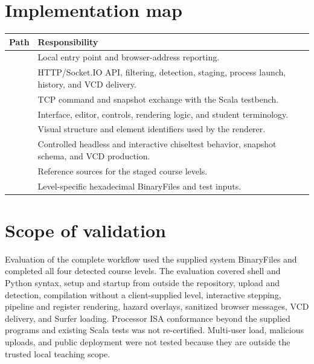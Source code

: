 \documentclass[11pt,a4paper]{article}
\begin{document}



\clearpage
\appendix
\section{Implementation map}\label{app:implementation-map}

\begin{center}
\centering
{}
\label{tab:implementation-map}
\footnotesize
\begin{tabularx}{\textwidth}{@{}>{\raggedright\arraybackslash}p{}Y@{}}
\toprule
Path & Responsibility \\
\midrule
{} & Local entry point and browser-address reporting. \\
 & HTTP/Socket.IO API, filtering, detection, staging, process launch, history, and VCD delivery. \\
 & TCP command and snapshot exchange with the Scala testbench. \\
 & Interface, editor, controls, rendering logic, and student terminology. \\
 & Visual structure and element identifiers used by the renderer. \\
 & Controlled headless and interactive chiseltest behavior, snapshot schema, and VCD production. \\
 & Reference sources for the staged course levels. \\
 & Level-specific hexadecimal BinaryFiles and test inputs. \\
\bottomrule
\end{tabularx}
\end{center}

\section{Scope of validation}

Evaluation of the complete workflow used the supplied system BinaryFiles and completed all four detected course levels. The evaluation covered shell and Python syntax, setup and startup from outside the repository, upload and detection, compilation without a client-supplied level, interactive stepping, pipeline and register rendering, hazard overlays, sanitized browser messages, VCD delivery, and Surfer loading. Processor ISA conformance beyond the supplied programs and existing Scala tests was not re-certified. Multi-user load, malicious uploads, and public deployment were not tested because they are outside the trusted local teaching scope.
\end{document}

